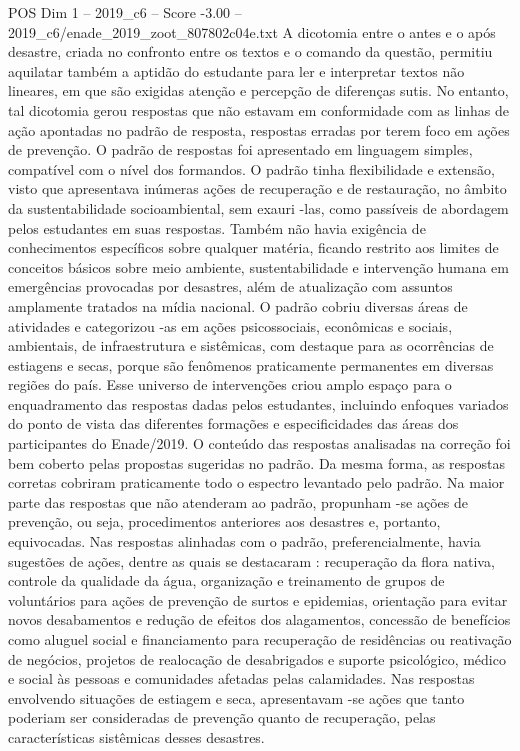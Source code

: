 \begin{textsample}{POS Dim 1 – 2019\_c6 – Score -3.00 – 2019\_c6/enade\_2019\_zoot\_807802c04e.txt}
A dicotomia entre o antes e o após desastre, criada no confronto entre os textos e o comando da questão, permitiu aquilatar também a aptidão do estudante para ler e interpretar textos não lineares, em que são exigidas atenção e percepção de diferenças sutis.
No entanto, tal dicotomia gerou respostas que não estavam em conformidade com as linhas de ação apontadas no padrão de resposta, respostas erradas por terem foco em ações de prevenção.
O padrão de respostas foi apresentado em linguagem simples, compatível com o nível dos formandos.
O padrão tinha flexibilidade e extensão, visto que apresentava inúmeras ações de recuperação e de restauração, no âmbito da sustentabilidade socioambiental, sem exauri -las, como passíveis de abordagem pelos estudantes em suas respostas.
Também não havia exigência de conhecimentos específicos sobre qualquer matéria, ficando restrito aos limites de conceitos básicos sobre meio ambiente, sustentabilidade e intervenção humana em emergências provocadas por desastres, além de atualização com assuntos amplamente tratados na mídia nacional.
O padrão cobriu diversas áreas de atividades e categorizou -as em ações psicossociais, econômicas e sociais, ambientais, de infraestrutura e sistêmicas, com destaque para as ocorrências de estiagens e secas, porque são fenômenos praticamente permanentes em diversas regiões do país.
Esse universo de intervenções criou amplo espaço para o enquadramento das respostas dadas pelos estudantes, incluindo enfoques variados do ponto de vista das diferentes formações e especificidades das áreas dos participantes do Enade/2019.
O conteúdo das respostas analisadas na correção foi bem coberto pelas propostas sugeridas no padrão.
Da mesma forma, as respostas corretas cobriram praticamente todo o espectro levantado pelo padrão.
Na maior parte das respostas que não atenderam ao padrão, propunham -se ações de prevenção, ou seja, procedimentos anteriores aos desastres e, portanto, equivocadas.
Nas respostas alinhadas com o padrão, preferencialmente, havia sugestões de ações, dentre as quais se destacaram : recuperação da flora nativa, controle da qualidade da água, organização e treinamento de grupos de voluntários para ações de prevenção de surtos e epidemias, orientação para evitar novos desabamentos e redução de efeitos dos alagamentos, concessão de benefícios como aluguel social e financiamento para recuperação de residências ou reativação de negócios, projetos de realocação de desabrigados e suporte psicológico, médico e social às pessoas e comunidades afetadas pelas calamidades.
Nas respostas envolvendo situações de estiagem e seca, apresentavam -se ações que tanto poderiam ser consideradas de prevenção quanto de recuperação, pelas características sistêmicas desses desastres.

\end{textsample}
